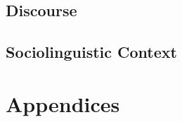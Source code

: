 \documentclass[12pt,letterpaper,openany,twoside]{memoir}
\let\originalpart=\part
\def\part{\cleardoublepage\originalpart}
\begin{document}
\chapter{Discourse}

\chapter{Sociolinguistic Context}


\appendix

\part{Appendices}




\backmatter


\printbibliography


\printindex
\end{document}
